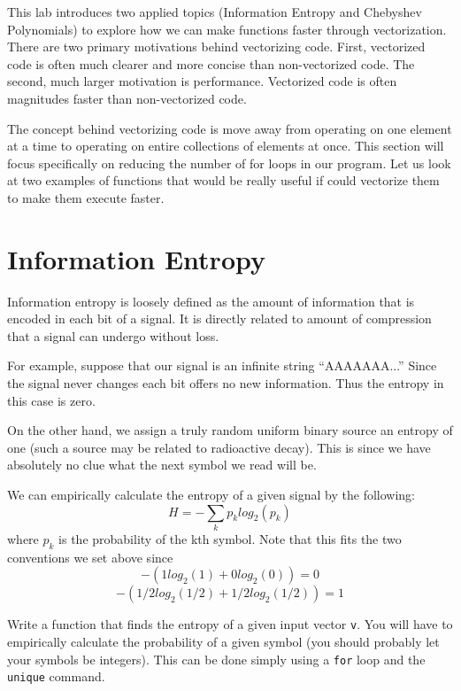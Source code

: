 

This lab introduces two applied topics (Information Entropy and Chebyshev Polynomials) to explore how we can make functions faster through vectorization.  There are two primary motivations behind vectorizing code.  First, vectorized code is often much clearer and more concise than non-vectorized code.  The second, much larger motivation is performance.  Vectorized code is often magnitudes faster than non-vectorized code.  

The concept behind vectorizing code is move away from operating on one element at a time to operating on entire collections of elements at once.  This section will focus specifically on reducing the number of for loops in our program.  Let us look at two examples of functions that would be really useful if could vectorize them to make them execute faster.

\section*{Information Entropy}

Information entropy is loosely defined as the amount of information that is encoded in each bit of a signal. It is directly related to amount of compression that a signal can undergo without loss.

For example, suppose that our signal is an infinite string ``AAAAAAA...'' Since the signal never changes each bit offers no new information. Thus the entropy in this case is zero.

On the other hand, we assign a truly random uniform binary source an entropy of one (such a source may be related to radioactive decay). This is since we have absolutely no clue what the next symbol we read will be.

We can empirically calculate the entropy of a given signal by the following:
\[
H = -\sum_k{p_k log_2(p_k)}
\]
where $p_k$ is the probability of the kth symbol. Note that this fits the two conventions we set above since
\[
-(1log_2(1) + 0 log_2(0)) = 0
\]
\[
-(1/2log_2(1/2) + 1/2log_2(1/2)) = 1
\]

\begin{problem}
Write a function that finds the entropy of a given input vector {\tt v}. You will have to empirically calculate the probability of a given symbol (you should probably let your symbols be integers). This can be done simply using a {\tt for} loop and the {\tt unique} command.
\end{problem}

